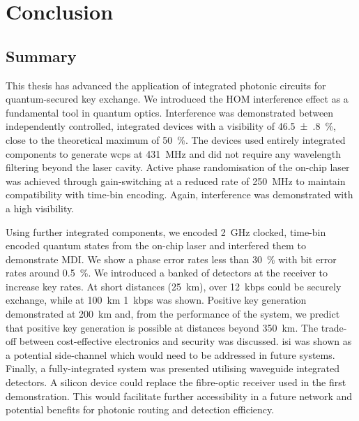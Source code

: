 %
%
\graphicspath{{./chapters/chapter07/fig07/}}

\let\textcircled=\pgftextcircled
\chapter{Conclusion}
\label{chap:conclusion}



\section{Summary}

This thesis has advanced the application of integrated photonic circuits for quantum-secured key exchange. We introduced the \ac{HOM} interference effect as a fundamental tool in quantum optics. Interference was demonstrated between independently controlled, integrated devices with a visibility of \SI{46.5(8)}{\percent}, close to the theoretical maximum of \SI{50}{\percent}. The devices used entirely integrated components to generate \acp{wcp} at \SI{431}{MHz} and did not require any wavelength filtering beyond the laser cavity. Active phase randomisation of the on-chip laser was achieved through gain-switching at a reduced rate of \SI{250}{MHz} to maintain compatibility with time-bin encoding. Again, interference was demonstrated with a high visibility.

Using further integrated components, we encoded \SI{2}{GHz} clocked, time-bin encoded quantum states from the on-chip laser and interfered them to demonstrate \ac{MDI}. We show a phase error rates less than \SI{30}{\percent} with bit error rates around \SI{0.5}{\percent}. We introduced a banked of detectors at the receiver to increase key rates. At short distances (\SI{25}{km}), over \SI{12}{kbps} could be securely exchange, while at \SI{100}{km} \SI{1}{kbps} was shown. Positive key generation demonstrated at \SI{200}{km} and, from the performance of the system, we predict that positive key generation is possible at distances beyond \SI{350}{km}. The trade-off between cost-effective electronics and security was discussed. \Ac{isi} was shown as a potential side-channel which would need to be addressed in future systems. Finally, a fully-integrated system was presented utilising waveguide integrated detectors. A silicon device could replace the fibre-optic receiver used in the first demonstration. This would facilitate further accessibility in a future network and potential benefits for photonic routing and detection efficiency. 

